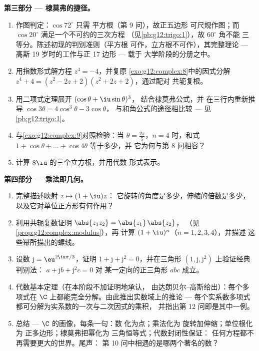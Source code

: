\begin{problem}
\medskip
\noindent\textbf{第三部分 --- 棣莫弗的捷径。}
\begin{enumerate}[resume]
  \item 作图判定：$\cos 72^\circ$ 只需
        平方根（第 9 问），故正五边形
        可尺规作图；而 $\cos 20^\circ$
        满足一个不可约的三次方程
        （见\cref{pb:g12:trigo:1}），故 $60^\circ$ 角不能
        三等分。陈述初现的判别准则（平方根
        可作，立方根不可作），其完整理论 ---
        高斯 19 岁时的工作与正 17 边形 --- 载于
        大学阶段的分册之中。
  \item 用指数形式解方程 $z^4 = -4$，并复原
        \cref{exo:g12:complex:8}中的因式分解
        $z^4 + 4 = (z^2 - 2z + 2)(z^2 + 2z + 2)$，通过配对
        共轭复根。
  \item 用二项式定理展开 $(\cos\theta + \iu\sin\theta)^3$，
        结合棣莫弗公式，并
        在三行内重新推导 $\cos 3\theta = 4\cos^3\theta - 3\cos\theta$，
        与和角公式的途径相比较 ---
        见\cref{pb:g12:trigo:1}。
  \item 与\cref{exo:g12:complex:9}对照检验：当
        $\theta = \frac{2\pi}{5}$，$n = 4$ 时，和式
        $1 + \cos\theta + \dots + \cos 4\theta$ 等于多少，并
        它为何与第 8 问相容？
  \item 计算 $8\iu$ 的三个立方根，并用代数
        形式表示。
\end{enumerate}

\medskip
\noindent\textbf{第四部分 --- 乘法即几何。}
\begin{enumerate}[resume]
  \item 完整描述映射 $z \mapsto (1 + \iu)z$：
        它旋转的角度是多少，伸缩的倍数是多少，
        以及它对单位正方形有何作用？
  \item 利用共轭复数证明 $\abs{z_1 z_2} = \abs{z_1}\,\abs{z_2}$，
        （见\cref{prop:g12:complex:modulus}），再
        计算 $(1+\iu)^n$（$n = 1, 2, 3, 4$），并描述
        这些幂所描出的螺线。
  \item 设数 $\mathrm{j} = \eu^{2\iu\pi/3}$，证明
        $1 + \mathrm{j} + \mathrm{j}^2 = 0$，并在三角形
        $\left(1, \mathrm{j}, \mathrm{j}^2\right)$ 上验证经典判别法：
        $a + \mathrm{j} b + \mathrm{j}^2 c = 0$ 对
        某一定向的正三角形 $abc$ 成立。
  \item 代数基本定理（在本阶段不加证明地承认，
        由达朗贝尔--高斯给出）：每个多项式在
        $\C$ 上都能完全分解。由此推出实数域上的推论 ---
        每个实系数多项式都可分解为实系数的一次与二次因式的乘积，
        并指出第 12 问即是其中一例。
  \item 总结 --- $\C$ 的画像，每条一句：数
        化为点；乘法化为
        旋转加伸缩；单位根化为
        正多边形；棣莫弗把幂化为
        三角恒等式；代数封闭性保证：
        任何方程都不再需要更大的世界。尾声：
        第 10 问中相遇的是哪两个著名的数？
\end{enumerate}
\end{problem}

